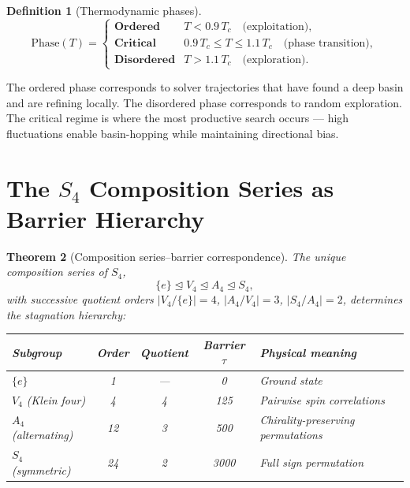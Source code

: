 \documentclass[11pt]{amsart}
\newtheorem{theorem}{Theorem}[section]
\theoremstyle{definition}
\newtheorem{definition}[theorem]{Definition}
\begin{document}
\begin{definition}[Thermodynamic phases]
\begin{equation}
\text{Phase}(T) = \begin{cases}
\textbf{Ordered} & T < 0.9\, T_c \quad \text{(exploitation)}, \\
\textbf{Critical} & 0.9\, T_c \leq T \leq 1.1\, T_c \quad \text{(phase transition)}, \\
\textbf{Disordered} & T > 1.1\, T_c \quad \text{(exploration)}.
\end{cases}
\end{equation}
\end{definition}

The ordered phase corresponds to solver trajectories that have found a deep basin and are refining locally. The disordered phase corresponds to random exploration. The critical regime is where the most productive search occurs --- high fluctuations enable basin-hopping while maintaining directional bias.


\section{The $S_4$ Composition Series as Barrier Hierarchy}
\label{sec:composition}

\begin{theorem}[Composition series--barrier correspondence]\label{thm:comp}
The unique composition series of $S_4$,
\[
\{e\} \trianglelefteq V_4 \trianglelefteq A_4 \trianglelefteq S_4,
\]
with successive quotient orders $|V_4/\{e\}| = 4$, $|A_4/V_4| = 3$, $|S_4/A_4| = 2$, determines the stagnation hierarchy:

\begin{center}
\begin{tabular}{l c c c l}
\toprule
Subgroup & Order & Quotient & Barrier $\tau$ & Physical meaning \\
\midrule
$\{e\}$ & 1 & --- & 0 & Ground state \\
$V_4$ (Klein four) & 4 & 4 & 125 & Pairwise spin correlations \\
$A_4$ (alternating) & 12 & 3 & 500 & Chirality-preserving permutations \\
$S_4$ (symmetric) & 24 & 2 & 3000 & Full sign permutation \\
\bottomrule
\end{tabular}
\end{center}
\end{theorem}
\end{document}
